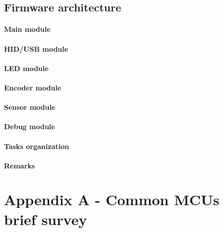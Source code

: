 \documentclass[a4paper,10pt]{article}
\begin{document}
\begin{multicols}{2}
\TODO


\subsection{Firmware architecture}

\TODO


\paragraph{Main module}
\TODO


\paragraph{HID/USB module}
\TODO


\paragraph{LED module}
\TODO


\paragraph{Encoder module}
\TODO


\paragraph{Sensor module}
\TODO


\paragraph{Debug module}
\TODO


\paragraph{Tasks organization}
\TODO


\paragraph{Remarks}
\TODO


\section{Appendix A - Common MCUs brief survey}


\end{multicols}
\end{document}
